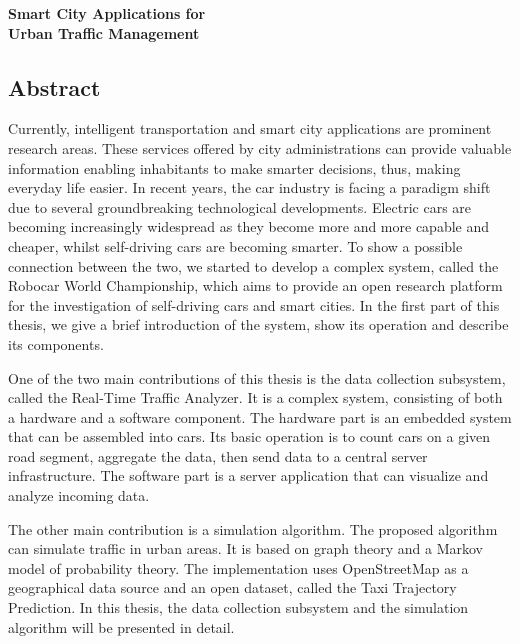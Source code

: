 \documentclass[b5paper,12pt]{report}
\theoremstyle{definition}
\begin{document}
\begin{singlespace}


\thispagestyle{empty}

\begin{center}
{\LARGE\bf Smart City Applications for \\Urban Traffic Management}
\vspace*{6cm}

\end{center}

\tableofcontents

\listoffigures

\listoftables

\end{singlespace}

\newpage
\subsection*{Abstract}
\begin{minipage}{.9\linewidth}
\singlespace
Currently, intelligent transportation and smart city applications are prominent research areas. These services offered by city administrations can provide valuable information enabling inhabitants to make smarter decisions, thus, making everyday life easier. In recent years, the car industry is facing a paradigm shift due to several groundbreaking technological developments. Electric cars are becoming increasingly widespread as they become more and more capable and cheaper, whilst self-driving cars are becoming smarter. To show a possible connection between the two, we started to develop a complex system, called the Robocar World Championship, which aims to provide an open research platform for the investigation of self-driving cars and smart cities. In the first part of this thesis, we give a brief introduction of the system, show its operation and describe its components. 

One of the two main contributions of this thesis is the data collection subsystem, called the Real-Time Traffic Analyzer. It is a complex system, consisting of both a hardware and a software component. The hardware part is an embedded system that can be assembled into cars. Its basic operation is to count cars on a given road segment, aggregate the data, then send data to a central server infrastructure. The software part is a server application that can visualize and analyze incoming data.

The other main contribution is a simulation algorithm. The proposed algorithm can simulate traffic in urban areas. It is based on graph theory and a Markov model of probability theory. The implementation uses OpenStreetMap as a geographical data source and an open dataset, called the Taxi Trajectory Prediction. In this thesis, the data collection subsystem and the simulation algorithm will be presented in detail.
\end{minipage}
\end{document}
